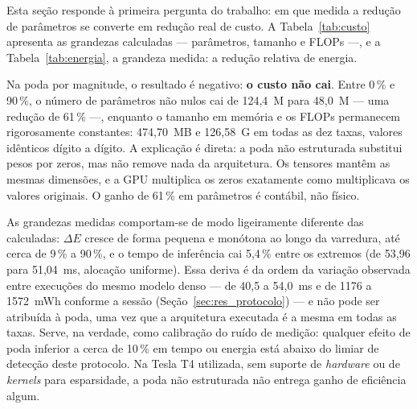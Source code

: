 Esta seção responde à primeira pergunta do trabalho: em que medida a redução de
parâmetros se converte em redução real de custo. A Tabela~\ref{tab:custo} apresenta as
grandezas calculadas --- parâmetros, tamanho e FLOPs ---, e a Tabela~\ref{tab:energia}, a
grandeza medida: a redução relativa de energia.

\begin{table}[htb]
\centering
\caption{Custo calculado dos modelos podados, por taxa de poda. Na poda por magnitude,
os parâmetros são os não nulos, e os valores referem-se à alocação uniforme; a global
produz os mesmos valores, pois nenhuma das duas altera a arquitetura. Na poda
estruturada, a taxa de poda é a fração de estruturas removidas, e os valores referem-se à
alocação global; as demais alocações removem frações de parâmetros que diferem desta em
até 2,1 pontos percentuais.}
\label{tab:custo}
\small

\end{table}

\begin{table}[htb]
\centering
\caption{Redução relativa de energia $\Delta E$ (\%, Equação~\ref{eq:delta_e}) em relação
ao modelo denso medido na mesma sessão. Na poda por magnitude, os valores estão abaixo do
limiar de detecção do protocolo, de cerca de 10\%. $\beta$ é o expoente de intensidade da
Equação~\ref{eq:alocacao_dev}, que controla o quanto a alocação segue o perfil de
sensibilidade: com $\beta = 1{,}0$ o perfil é seguido integralmente, e com
$\beta = 0{,}5$ as diferenças entre camadas são atenuadas.}
\label{tab:energia}
\small

\end{table}

Na poda por magnitude, o resultado é negativo: \textbf{o custo não cai}. Entre 0\,\% e
90\,\%, o número de parâmetros não nulos cai de 124,4~M para 48,0~M --- uma redução de
61\,\% ---, enquanto o tamanho em memória e os FLOPs permanecem rigorosamente
constantes: 474,70~MB e 126,58~G em todas as dez taxas, valores idênticos dígito a
dígito. A explicação é direta: a poda não estruturada substitui pesos por zeros, mas não
remove nada da arquitetura. Os tensores mantêm as mesmas dimensões, e a GPU multiplica os
zeros exatamente como multiplicava os valores originais. O ganho de 61\,\% em parâmetros
é contábil, não físico.

As grandezas medidas comportam-se de modo ligeiramente diferente das calculadas:
$\Delta E$ cresce de forma pequena e monótona ao longo da varredura, até cerca de 9\,\% a
90\,\%, e o tempo de inferência cai 5,4\,\% entre os extremos (de 53,96 para 51,04~ms,
alocação uniforme). Essa deriva é da ordem da variação observada entre execuções do
mesmo modelo denso --- de 40,5 a 54,0~ms e de 1176 a 1572~mWh conforme a sessão
(Seção~\ref{sec:res_protocolo}) --- e não pode ser atribuída à poda, uma vez que a
arquitetura executada é a mesma em todas as taxas. Serve, na verdade, como calibração do
ruído de medição: qualquer efeito de poda inferior a cerca de 10\,\% em tempo ou energia
está abaixo do limiar de detecção deste protocolo. Na Tesla T4 utilizada, sem suporte de
\textit{hardware} ou de \textit{kernels} para esparsidade, a poda não estruturada não
entrega ganho de eficiência algum.

